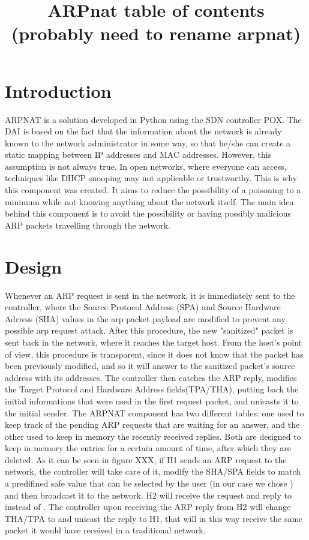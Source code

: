 \documentclass[11pt]{article}
\title{\textbf{ARPnat table of contents\\(probably need to rename arpnat)}}
\date{}
\newcommand*{\code}{\fontfamily{lmtt}\selectfont}
\begin{document}
\maketitle
\tableofcontents

\section{Introduction}
ARPNAT is a solution developed in Python using the SDN controller POX. The DAI is based on the fact that the information about the network is already known to the network administrator in some way, so that he/she can create a static mapping between IP addresses and MAC addresses. However, this assumption is not always true. In open networks, where everyone can access, techniques like DHCP snooping may not applicable or trustworthy. This is why this component was created. It aims to reduce the possibility of a poisoning to a minimum while not knowing anything about the network itself.
The main idea behind this component is to avoid the possibility or having possibly malicious ARP packets travelling through the network.
\section{Design} 
Whenever an ARP request is sent in the network, it is immediately sent to the controller, where the Source Protocol Address (SPA) and Source Hardware Adrress (SHA) values in the arp packet payload are modified to prevent any possible arp request attack. After this procedure, the new "sanitized" packet is sent back in the network, where it reaches the target host. From the host's point of view, this procedure is transparent, since it does not know that the packet has been previously modified, and so it will answer to the sanitized packet's source address with its addresses.
The controller then catches the ARP reply, modifies the Target Protocol and Hardware Address fields(TPA/THA), putting back the initial informations that were used in the first request packet, and unicasts it to the initial sender.
The ARPNAT component has two different tables: one used to keep track of the pending ARP requests that are waiting for an answer, and the other used to keep in memory the recently received replies. Both are designed to keep in memory the entries for a certain amount of time, after which they are deleted.
As it can be seen in figure XXX, if H1 sends an ARP request to the network, the controller will take care of it, modify the SHA/SPA fields to match a predifined safe value that can be selected by the user (in our case we chose {\code{10.0.0.100/00:11:22:33:44:55}}) and then broadcast it to the network. H2 will receive the request and reply to {\code{00:11:22:33:44:55}} instead of {\code{00:00:00:00:00:01}}. The controller upon receiving the ARP reply from H2 will change THA/TPA to {\code{10.0.0.1/00:00:00:00:00:01}} and unicast the reply to H1, that will in this way receive the same packet it would have received in a traditional network.
\end{document}
